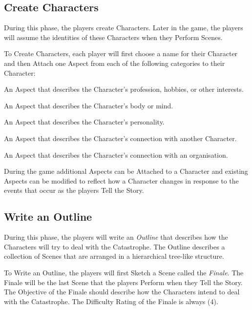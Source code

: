\documentclass[12pt, a5paper, parskip=half-]{scrartcl}
\begin{document}
\newpage

\subsection*{Create Characters}
During this phase, the players create Characters.
Later in the game, the players will assume the identities of these Characters when they Perform Scenes.

To Create Characters, each player will first choose a name for their Character and then Attach one Aspect from each of the following categories to their Character:
\begin{description}[leftmargin=0pt]
   \item[Occupation]
     An Aspect that describes the Character's profession, hobbies, or other interests.
   \item[Physical or Mental Characteristic]
     An Aspect that describes the Character's body or mind.
   \item[Psychological Characteristic]
     An Aspect that describes the Character's personality.
   \item[Relationship]
     An Aspect that describes the Character's connection with another Character.
   \item[Affiliation]
     An Aspect that describes the Character's connection with an organisation.
\end{description}

\bigskip

During the game additional Aspects can be Attached to a Character and existing Aspects can be modified to reflect how a Character changes in response to the events that occur as the players Tell the Story.

\newpage

\subsection*{Write an Outline}
During this phase, the players will write an \emph{Outline} that describes how the Characters will try to deal with the Catastrophe.
The Outline describes a collection of Scenes that are arranged in a hierarchical tree-like structure.

To Write an Outline, the players will first Sketch a Scene called the \emph{Finale}.
The Finale will be the last Scene that the players Perform when they Tell the Story.
The Objective of the Finale should describe how the Characters intend to deal with the Catastrophe.
The Difficulty Rating of the Finale is always (4).
\end{document}
